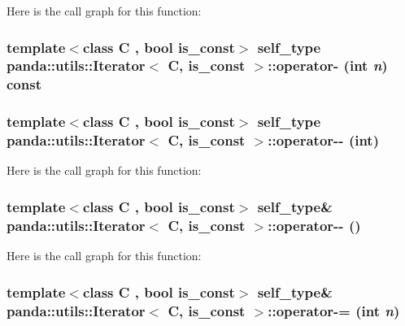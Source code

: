 Here is the call graph for this function:\hypertarget{classpanda_1_1utils_1_1Iterator_a53cc020359c8394259d057eb53307be9}{
\subsubsection[{operator-\/}]{\setlength{\rightskip}{0pt plus 5cm}template$<$class C , bool is\_\-const$>$ {\bf self\_\-type} {\bf panda::utils::Iterator}$<$ C, is\_\-const $>$::operator-\/ (int {\em n}) const}}
\label{classpanda_1_1utils_1_1Iterator_a53cc020359c8394259d057eb53307be9}
\hypertarget{classpanda_1_1utils_1_1Iterator_a9fc09ba0942a647bf1c6a493de4057cd}{
\subsubsection[{operator-\/-\/}]{\setlength{\rightskip}{0pt plus 5cm}template$<$class C , bool is\_\-const$>$ {\bf self\_\-type} {\bf panda::utils::Iterator}$<$ C, is\_\-const $>$::operator-\/-\/ (int)}}
\label{classpanda_1_1utils_1_1Iterator_a9fc09ba0942a647bf1c6a493de4057cd}


Here is the call graph for this function:\hypertarget{classpanda_1_1utils_1_1Iterator_a96e8ebf69342e0036f7197fdbc9ed775}{
\subsubsection[{operator-\/-\/}]{\setlength{\rightskip}{0pt plus 5cm}template$<$class C , bool is\_\-const$>$ {\bf self\_\-type}\& {\bf panda::utils::Iterator}$<$ C, is\_\-const $>$::operator-\/-\/ ()}}
\label{classpanda_1_1utils_1_1Iterator_a96e8ebf69342e0036f7197fdbc9ed775}


Here is the call graph for this function:\hypertarget{classpanda_1_1utils_1_1Iterator_a6cde570ecd522b49d39c8aca8aa8c9c7}{
\subsubsection[{operator-\/=}]{\setlength{\rightskip}{0pt plus 5cm}template$<$class C , bool is\_\-const$>$ {\bf self\_\-type}\& {\bf panda::utils::Iterator}$<$ C, is\_\-const $>$::operator-\/= (int {\em n})}}
\label{classpanda_1_1utils_1_1Iterator_a6cde570ecd522b49d39c8aca8aa8c9c7}


